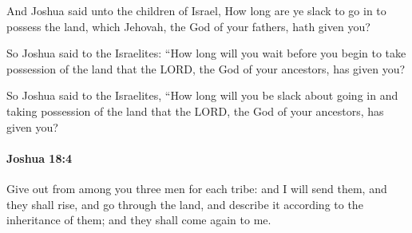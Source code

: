 			\begin{versebox}
					\item[BHS] 
					\item[ASV] And Joshua said unto the children of Israel, How long are ye slack to go in to possess the land, which Jehovah, the God of your fathers, hath given you?
					\item[NIV] So Joshua said to the Israelites: “How long will you wait before you begin to take possession of the land that the LORD, the God of your ancestors, has given you?
					\item[NRSV] So Joshua said to the Israelites, “How long will you be slack about going in and taking possession of the land that the LORD, the God of your ancestors, has given you?
			\end{versebox}

		\paragraph{Joshua 18:4} %
			\label{JOSHUA-18-4}

			Give out from among you three men for each tribe: and I will send them, and they shall rise, and go through the land, and describe it according to the inheritance of them; and they shall come again to me.

